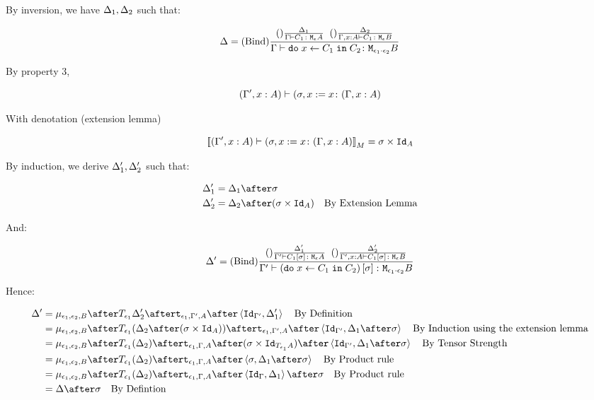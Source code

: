 {    By inversion, we have $\Delta_1, \Delta_2$ such that:
    
    \begin{equation}
        \Delta = (\text{Bind}) \frac{
            (\text{}) \frac{\Delta_1}{\Gamma \vdash C_1 \colon \texttt{M}_{\epsilon}{A}}
            \;\;
            (\text{}) \frac{\Delta_2}{\Gamma, x:A  \vdash C_1 \colon \texttt{M}_{\epsilon}{B}}
        }{
            \Gamma \vdash \texttt{do}\; x \leftarrow C_1 \;\texttt{in}\; C_2 \colon \texttt{M}_{\epsilon_1\cdot\epsilon_2}{B}
        }
    \end{equation}

    By property 3,

    \begin{equation}
        (\Gamma', x:A) \vdash (\sigma, x:= x \colon (\Gamma, x: A)
    \end{equation}

    With denotation (extension lemma)

    \begin{equation}
        {\bf [\![}(\Gamma', x:A) \vdash (\sigma, x:= x \colon (\Gamma, x: A){\bf ]\!]}_M = \sigma\times\texttt{Id}_{A}
    \end{equation}

    By induction, we derive $\Delta_1', \Delta_2'$ such that:

    \begin{align}
        \D_1' & = \D_1\after \si\\
        \D_2' & = \D_2\after (\si\times\Id{A})\qt{By Extension Lemma}
    \end{align}

    And:

    \begin{equation}
        \Delta' = (\text{Bind}) \frac{
            (\text{}) \frac{\Delta_1'}{\Gamma' \vdash C_1\left[\sigma\right] \colon \texttt{M}_{\epsilon}{A}}
            \;\;
            (\text{}) \frac{\Delta_2'}{\Gamma', x:A  \vdash C_1\left[\sigma\right] \colon \texttt{M}_{\epsilon}{B}}
        }{
            \Gamma' \vdash (\texttt{do}\; x \leftarrow C_1 \;\texttt{in}\; C_2)\left[\sigma\right] \colon \texttt{M}_{\epsilon_1\cdot\epsilon_2}{B}
        }
    \end{equation}

    Hence:

    \begin{align}
        \D' & = \bind{\e_1}{\e_2}{B}\after\T{\e_1}{\D_2'}\after\tstrength{\e_1}{\G'}{A}\after\pr{\Id{\G'}}{\D_1'}\qt{By Definition}\\
        & = \bind{\e_1}{\e_2}{B}\after\T{\e_1}{(\D_2\after(\si\times\Id{A}))}\after\tstrength{\e_1}{\G'}{A}\after\pr{\Id{\G'}}{\D_1\after\si}\qt{By Induction using the extension lemma}\\
        & = \bind{\e_1}{\e_2}{B}\after\T{\e_1}{(\D_2)}\after\tstrength{\e_1}{\G}{A}\after(\si\times\Id{\T{\e_1}{A}})\after\pr{\Id{\G'}}{\D_1\after\si}\qt{By Tensor Strength}\\
        & = \bind{\e_1}{\e_2}{B}\after\T{\e_1}{(\D_2)}\after\tstrength{\e_1}{\G}{A}\after\pr{\si}{\D_1\after\si}\qt{By Product rule}\\
        & = \bind{\e_1}{\e_2}{B}\after\T{\e_1}{(\D_2)}\after\tstrength{\e_1}{\G}{A}\after\pr{\idg}{\D_1}\after\si\qt{By Product rule}\\
        &= \D\after\si\qt{By Defintion}\\
    \end{align}


}
